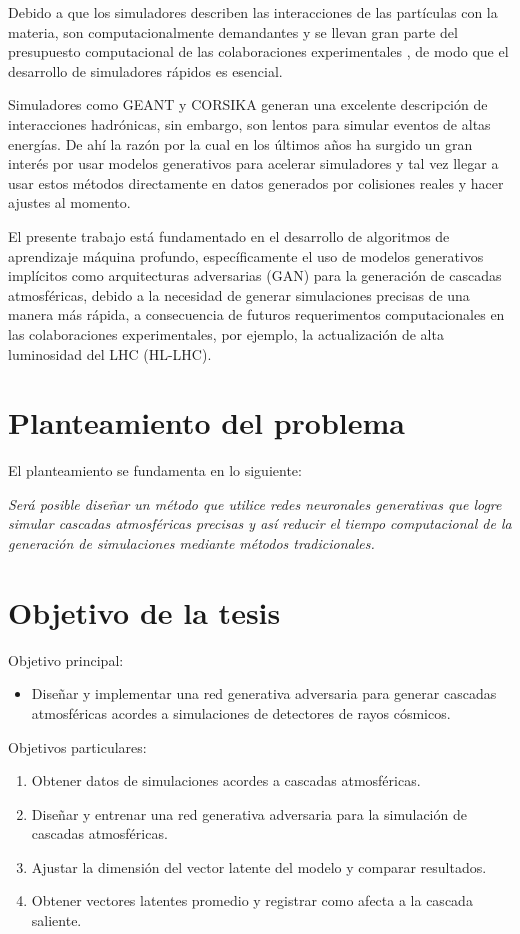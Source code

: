 Debido a que los simuladores describen las interacciones de las partículas con la materia, son computacionalmente demandantes y se llevan gran parte del presupuesto computacional de las colaboraciones experimentales \parencite{Elmer2017}, de modo que el desarrollo de simuladores rápidos es esencial.

Simuladores como GEANT y CORSIKA generan una excelente descripción de interacciones hadrónicas, sin embargo, son lentos para simular eventos de altas energías. De ahí la razón por la cual en los últimos años ha surgido un gran interés por usar modelos generativos para acelerar simuladores y tal vez llegar a usar estos métodos directamente en datos generados por colisiones reales y hacer ajustes al momento.

El presente trabajo está fundamentado en el desarrollo de algoritmos de aprendizaje máquina profundo, específicamente el uso de modelos generativos implícitos como arquitecturas adversarias (GAN) para la generación de cascadas atmosféricas, debido a la necesidad de generar simulaciones precisas de una manera más rápida, a consecuencia de futuros requerimentos computacionales en las colaboraciones experimentales, por ejemplo, la actualización de alta luminosidad del LHC (HL-LHC)\parencite{Elmer2017}.

\section{Planteamiento del problema}

El planteamiento se fundamenta en lo siguiente:

\emph{Será posible diseñar un método que utilice redes neuronales generativas que logre simular cascadas atmosféricas precisas y así reducir el tiempo computacional de la generación de simulaciones mediante métodos tradicionales.}


\section{Objetivo de la tesis}
Objetivo principal:
\begin{itemize}
   \item Diseñar y implementar una red generativa adversaria para generar cascadas atmosféricas acordes a simulaciones de detectores de rayos cósmicos.
\end{itemize}

Objetivos particulares:
\renewcommand{\theenumi}{\roman{enumi}}%
\begin{enumerate}
   \item Obtener datos de simulaciones acordes a cascadas atmosféricas.
   \item Diseñar y entrenar una red generativa adversaria para la simulación de cascadas atmosféricas.
   \item Ajustar la dimensión del vector latente del modelo y comparar resultados.
   \item Obtener vectores latentes promedio y registrar como afecta a la cascada saliente.
\end{enumerate}

